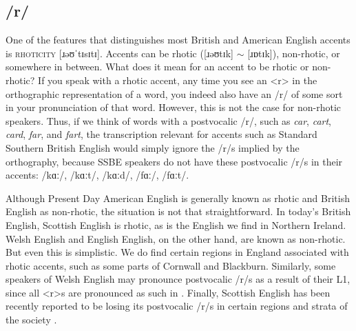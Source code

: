 \subsection{/r/}\label{LModE-r}
One of the features that distinguishes most British and American English accents is \textsc{rhoticity} {[}ɹəʊˈtɪsɪtɪ{]}. Accents can be rhotic ({[}ɹəʊtɪk{]} $\sim$ {[}ɹɒtɪk{]}), non-rhotic, or somewhere in between. What does it mean for an accent to be rhotic or non-rhotic? If you speak with a rhotic accent, any time you see an <r> in the orthographic representation of a word, you indeed also have an /r/ of some sort in your pronunciation of that word. However, this is not the case for non-rhotic speakers. Thus, if we think of words with a postvocalic /r/, such as \textit{car}, \textit{cart}, \textit{card}, \textit{far}, and \textit{fart}, the transcription relevant for accents such as Standard Southern British English would simply ignore the /r/s implied by the orthography, because SSBE speakers do not have these postvocalic /r/s in their accents: /kɑː/, /kɑːt/, /kɑːd/, /fɑː/, /fɑːt/.

Although Present Day American English is generally known as rhotic and British English as non-rhotic, the situation is not that straightforward. In today's British English, Scottish English is rhotic, as is the English we find in Northern Ireland. Welsh English and English English, on the other hand, are known as non-rhotic. But even this is simplistic. We do find certain regions in England associated with rhotic accents, such as some parts of Cornwall and Blackburn. Similarly, some speakers of Welsh English may pronounce postvocalic /r/s as a result of their L1, since all <r>s are pronounced as such in . Finally, Scottish English has been recently reported to be losing its postvocalic /r/s in certain regions and strata of the society \citep{StuartSmith2013}.

